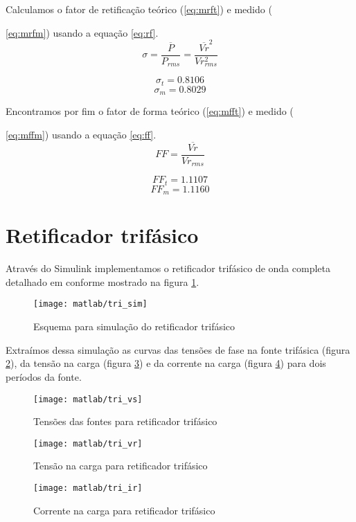 \documentclass{report}
\begin{document}
Calculamos o fator de retificação teórico (\ref{eq:mrft}) e medido ({\ref{eq:mrfm}) usando a equação \ref{eq:rf}.
\begin{equation}
	\sigma = \frac{\overline{P}}{P_{rms}} = \frac{\overline{Vr}^2}{Vr_{rms}^2}
	\label{eq:rf}
\end{equation}

\begin{equation}
	\sigma_t = 0.8106
	\label{eq:mrft}
\end{equation}
\begin{equation}
	\sigma_m = 0.8029
	\label{eq:mrfm}
\end{equation}

Encontramos por fim o fator de forma teórico (\ref{eq:mfft}) e medido ({\ref{eq:mffm}) usando a equação \ref{eq:ff}.
\begin{equation}
FF = \frac{\overline{Vr}}{Vr_{rms}}
\label{eq:ff}
\end{equation}

\begin{equation}
FF_t = 1.1107
\label{eq:mfft}
\end{equation}
\begin{equation}
FF_m = 1.1160
\label{eq:mffm}
\end{equation}
\section{Retificador trifásico}
Através do Simulink implementamos o retificador trifásico de onda completa detalhado em \cite{bb:roteirosim1} conforme mostrado na figura \ref{fig:tsim}.
\begin{figure}[H]
	\centering
	\texttt{[image: matlab/tri\_sim]}
	\caption{Esquema para simulação do retificador trifásico}
	\label{fig:tsim}
\end{figure}

Extraímos dessa simulação as curvas das tensões de fase na fonte trifásica (figura \ref{fig:tvs}), da tensão na carga (figura \ref{fig:tvr}) e da corrente na carga (figura \ref{fig:tir}) para dois períodos da fonte.
\begin{figure}[H]
	\centering
	\texttt{[image: matlab/tri\_vs]}
	\caption{Tensões das fontes para retificador trifásico}
	\label{fig:tvs}
\end{figure}
\begin{figure}[H]
	\centering
	\texttt{[image: matlab/tri\_vr]}
	\caption{Tensão na carga para retificador trifásico}
	\label{fig:tvr}
\end{figure}
\begin{figure}[H]
	\centering
	\texttt{[image: matlab/tri\_ir]}
	\caption{Corrente na carga para retificador trifásico}
	\label{fig:tir}
\end{figure}

}}
\end{document}
